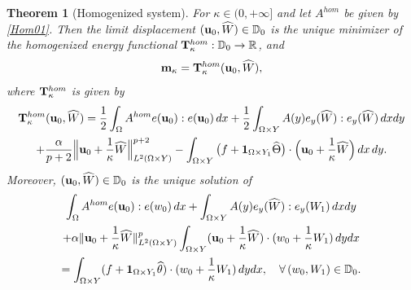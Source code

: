 \documentclass[11pt,a4paper]{article}
\numberwithin{equation}{section}
\def\1{{\bf 1}}
\def\O{\Omega}
\def\a{{\alpha}}
\def\R{{\mathbb{R}}}
\def\D{{\mathbb{D}}}
\def\R{{\mathbb{R}}}
\def\wh{\widehat }
\def\wt{\widetilde }
\def\X{\times }
\def\Gm{{\bf m}}
\def\Gu{{\bf u}}
\def\GH{{\bf H}}
\def\GT{{\bf T}}
\newtheorem{theorem}{Theorem}[section]
\begin{document}
\begin{theorem}[Homogenized system]
	\label{56}
	For $\kappa\in(0,+\infty]$ and let $A^{hom}$ be given by \eqref{Hom01}. 
	Then the limit displacement $(\Gu_0,\wh W)\in \D_0$ is the unique minimizer of the homogenized energy functional
	$\GT^{hom}_\kappa:\D_0\to\R$, and
	\begin{equation}\label{425}
		\Gm_\kappa=\GT^{hom}_\kappa(\Gu_0,\wh W),
	\end{equation}
	where $\GT^{hom}_\kappa$ is given by
	\begin{multline}\label{Thm:HomEnergy}
		\GT^{hom}_\kappa(\Gu_0,\wh W)
		=
		\frac12\int_\O A^{hom}e(\Gu_0):e(\Gu_0)\,dx+{1\over 2}\int_{\O\X Y}A(y) e_y(\wh W):e_y(\wh W)\,dxdy\\
		+\frac{\a}{p+2}\Big\|\Gu_0+\frac1\kappa\wh W\Big\|_{L^2(\O\times Y)}^{p+2}
		-\int_{\O\times Y}\big(f+\1_{\O\X Y_1}\wh\Theta\big)\cdot\Big(\Gu_0+\frac1\kappa\wh W\Big)\,dx\,dy.
	\end{multline}
	Moreover, $(\Gu_0,\wh W)\in\D_0$ is the unique solution of 
		\begin{multline*}
		\int_{\O}A^{hom}e(\Gu_0):e(w_0)\,dx+\int_{\O\X Y}A(y) e_y(\wh W):e_y(W_1)\,dxdy\\
		+\a\|\Gu_0+{1\over \kappa}\wh W\|^p_{L^2(\O\X Y)}\int_{\O\X Y}(\Gu_0+{1\over \kappa}\wh W)\cdot (w_0+{1\over \kappa}W_1)\,dydx\\
		=\int_{\O\X Y}(f+\1_{\O\X Y_1}\wh \theta)\cdot (w_0+{1\over \kappa}W_1)\,dydx,\quad\forall\,(w_0,W_1)\in\D_0.
	\end{multline*}
\end{theorem}
\end{document}
